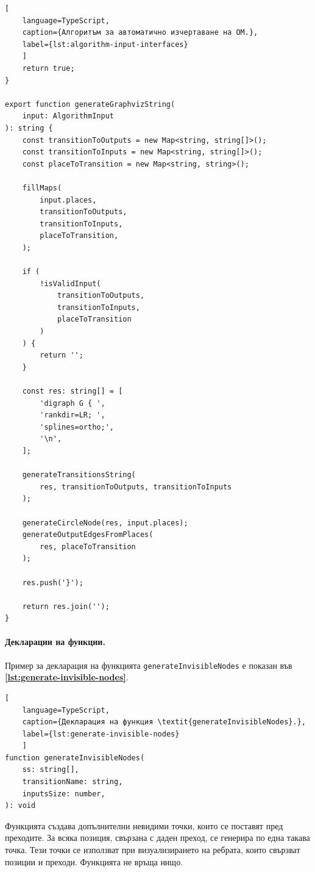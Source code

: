 \begin{lstlisting}[
	language=TypeScript,
	caption={Алгоритъм за автоматично изчертаване на ОМ.},
	label={lst:algorithm-input-interfaces}
	]
    return true;
}

export function generateGraphvizString(
    input: AlgorithmInput 
): string {
    const transitionToOutputs = new Map<string, string[]>();
    const transitionToInputs = new Map<string, string[]>();
    const placeToTransition = new Map<string, string>();
    
    fillMaps(
        input.places,
        transitionToOutputs,
        transitionToInputs,
        placeToTransition,
    );
    
    if (
        !isValidInput(
            transitionToOutputs, 
            transitionToInputs,
            placeToTransition
        )
    ) {
        return '';
    }
    
    const res: string[] = [
        'digraph G { ',
        'rankdir=LR; ',
        'splines=ortho;',
        '\n',
    ];
        
    generateTransitionsString(
        res, transitionToOutputs, transitionToInputs
    );
        
    generateCircleNode(res, input.places);
    generateOutputEdgesFromPlaces(
        res, placeToTransition
    );
        
    res.push('}');
    
    return res.join('');
}
\end{lstlisting}

\vspace{0.25cm}

\paragraph{Декларации на функции.}
\mbox{}

Пример за декларация на функцията \texttt{generateInvisibleNodes} е показан във \textbf{\autoref{lst:generate-invisible-nodes}}.
\begin{lstlisting}[
	language=TypeScript,
	caption={Декларация на функция \textit{generateInvisibleNodes}.},
	label={lst:generate-invisible-nodes}
	]
function generateInvisibleNodes(
    ss: string[],
    transitionName: string,
    inputsSize: number,
): void
\end{lstlisting}

Функцията създава допълнителни невидими точки, които се поставят пред преходите. За всяка позиция, свързана с даден преход, се генерира по една такава точка. Тези точки се използват при визуализирането на ребрата, които свързват позиции и преходи. Функцията не връща нищо.

